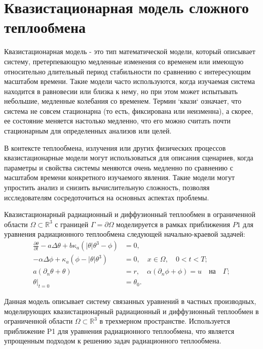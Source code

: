 \section{Квазистационарная модель сложного теплообмена}
\label{sec:ch1/sec4}
Квазистационарная модель - это тип математической модели,
который описывает систему, претерпевающую медленные изменения
со временем или имеющую относительно длительный период стабильности
по сравнению с интересующим масштабом времени.
Такие модели часто используются, когда изучаемая система находится
в равновесии или близка к нему, но при этом может испытывать небольшие,
медленные колебания со временем.
Термин `квази` означает,
что система не совсем стационарна (то есть, фиксирована или неизменна),
а скорее, ее состояние меняется настолько медленно, что его можно считать
почти стационарным для определенных анализов или целей.

В контексте теплообмена, излучения или других физических процессов
квазистационарные модели могут использоваться для описания сценариев,
когда параметры и свойства системы меняются очень медленно по сравнению
с масштабом времени конкретного изучаемого явления.
Такие модели могут упростить анализ и снизить вычислительную сложность,
позволяя исследователям сосредоточиться на основных аспектах проблемы.


Квазистационарный радиационный и диффузионный теплообмен в ограниченной
области $\Omega \subset \mathbb{R}^3$ с границей
$\Gamma = \partial\Omega$ моделируется в рамках приближения $P1$
для уравнения радиационного теплообмена следующей
начально-краевой задачей:
\begin{align}
    \frac{\partial\theta}{\partial t} - a\Delta\theta
    + b\kappa_a (|\theta|\theta^3 - \phi) &= 0, \\
    - \alpha\Delta\phi + \kappa_a (\phi - |\theta|\theta^3 ) &= 0,
    \quad x \in \Omega, \quad 0 < t < T ; \label{eq:1_4:1} \\
    a(\partial_n \theta + \theta) &= r,
    \quad \alpha(\partial_n \phi + \phi) = u
    \quad \text{на} \quad \Gamma ; \label{eq:1_4:2} \\
    \theta|_{t=0} &= \theta_0. \label{eq:1_4:3}
\end{align}

Данная модель описывает систему связанных уравнений в частных производных,
моделирующих квазистационарный радиационный и диффузионный теплообмен в
ограниченной области $\Omega \subset \mathbb{R}^3$ в трехмерном пространстве.
Используется приближение P1 для уравнения радиационного теплообмена,
что является упрощенным подходом к решению задач радиационного теплообмена.

